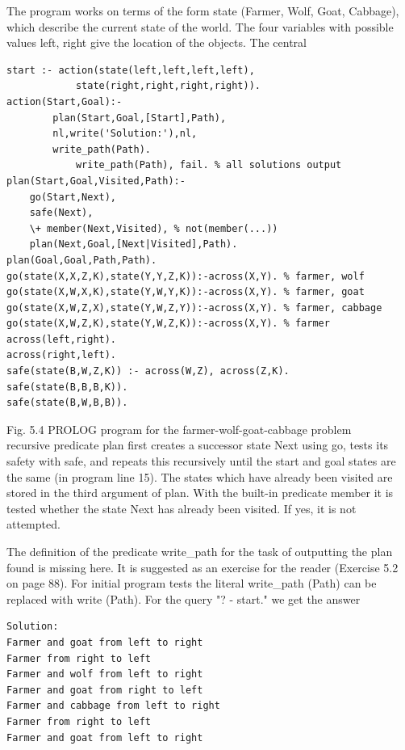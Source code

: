 \documentclass[10pt]{book}
\begin{document}
The program works on terms of the form state (Farmer, Wolf, Goat, Cabbage), which describe the current state of the world. The four variables with possible values left, right give the location of the objects. The central

\begin{verbatim}
start :- action(state(left,left,left,left),
            state(right,right,right,right)).
action(Start,Goal):-
        plan(Start,Goal,[Start],Path),
        nl,write('Solution:'),nl,
        write_path(Path).
            write_path(Path), fail. % all solutions output
plan(Start,Goal,Visited,Path):-
    go(Start,Next),
    safe(Next),
    \+ member(Next,Visited), % not(member(...))
    plan(Next,Goal,[Next|Visited],Path).
plan(Goal,Goal,Path,Path).
go(state(X,X,Z,K),state(Y,Y,Z,K)):-across(X,Y). % farmer, wolf
go(state(X,W,X,K),state(Y,W,Y,K)):-across(X,Y). % farmer, goat
go(state(X,W,Z,X),state(Y,W,Z,Y)):-across(X,Y). % farmer, cabbage
go(state(X,W,Z,K),state(Y,W,Z,K)):-across(X,Y). % farmer
across(left,right).
across(right,left).
safe(state(B,W,Z,K)) :- across(W,Z), across(Z,K).
safe(state(B,B,B,K)).
safe(state(B,W,B,B)).
\end{verbatim}

Fig. 5.4 PROLOG program for the farmer-wolf-goat-cabbage problem\\

recursive predicate plan first creates a successor state Next using go, tests its safety with safe, and repeats this recursively until the start and goal states are the same (in program line 15). The states which have already been visited are stored in the third argument of plan. With the built-in predicate member it is tested whether the state Next has already been visited. If yes, it is not attempted.

The definition of the predicate write\_path for the task of outputting the plan found is missing here. It is suggested as an exercise for the reader (Exercise 5.2 on page 88). For initial program tests the literal write\_path (Path) can be replaced with write (Path). For the query "? - start." we get the answer

\begin{verbatim}
Solution:
Farmer and goat from left to right
Farmer from right to left
Farmer and wolf from left to right
Farmer and goat from right to left
Farmer and cabbage from left to right
Farmer from right to left
Farmer and goat from left to right
\end{verbatim}
\end{document}
